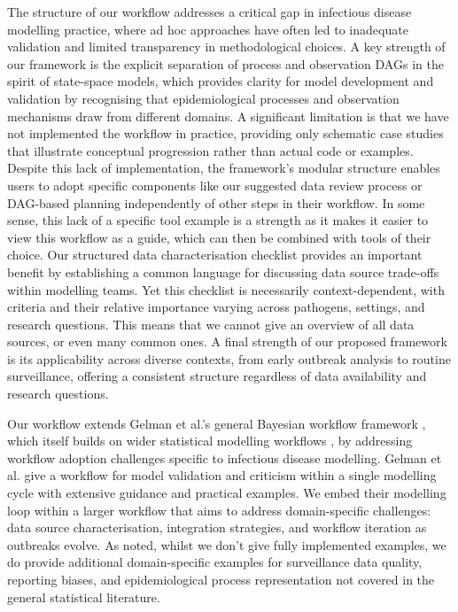 \documentclass{article}
\begin{document}
The structure of our workflow addresses a critical gap in infectious disease modelling practice, where ad hoc approaches have often led to inadequate validation and limited transparency in methodological choices.
A key strength of our framework is the explicit separation of process and observation \ac{DAG}s in the spirit of state-space models, which provides clarity for model development and validation by recognising that epidemiological processes and observation mechanisms draw from different domains.
A significant limitation is that we have not implemented the workflow in practice, providing only schematic case studies that illustrate conceptual progression rather than actual code or examples.
Despite this lack of implementation, the framework's modular structure enables users to adopt specific components like our suggested data review process or DAG-based planning independently of other steps in their workflow.
In some sense, this lack of a specific tool example is a strength as it makes it easier to view this workflow as a guide, which can then be combined with tools of their choice.
Our structured data characterisation checklist provides an important benefit by establishing a common language for discussing data source trade-offs within modelling teams.
Yet this checklist is necessarily context-dependent, with criteria and their relative importance varying across pathogens, settings, and research questions.
This means that we cannot give an overview of all data sources, or even many common ones.
A final strength of our proposed framework is its applicability across diverse contexts, from early outbreak analysis to routine surveillance, offering a consistent structure regardless of data availability and research questions.


Our workflow extends Gelman et al.'s general Bayesian workflow framework \citep{gelman2020bayesian}, which itself builds on wider statistical modelling workflows \citep{box1979robustness,Box1980,green2003highly}, by addressing workflow adoption challenges specific to infectious disease modelling.
Gelman et al. give a workflow for model validation and criticism within a single modelling cycle with extensive guidance and practical examples.
We embed their modelling loop within a larger workflow that aims to address domain-specific challenges: data source characterisation, integration strategies, and workflow iteration as outbreaks evolve. 
As noted, whilst we don't give fully implemented examples, we do provide additional domain-specific examples for surveillance data quality, reporting biases, and epidemiological process representation not covered in the general statistical literature.
 
\end{document}
